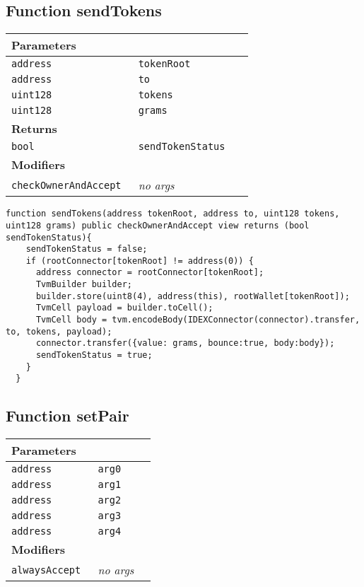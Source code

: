 \subsection{Function sendTokens}


\ifsoltables
\noindent\begin{tabular}{|l|l|p{5cm}|}\hline
\multicolumn{3}{|l|}{\bf Parameters}\\\hline
\tt address & \tt tokenRoot &\\\hline
\tt address & \tt to &\\\hline
\tt uint128 & \tt tokens &\\\hline
\tt uint128 & \tt grams &\\\hline
\multicolumn{3}{|l|}{\bf Returns}\\\hline
\tt bool & \tt sendTokenStatus &\\\hline
\multicolumn{3}{|l|}{\bf Modifiers}\\\hline
\tt checkOwnerAndAccept & {\em no args} &\\\hline
\end{tabular}
\fi

\vspace{2cm}

\begin{lstlisting}[firstnumber=399]
  function sendTokens(address tokenRoot, address to, uint128 tokens, uint128 grams) public checkOwnerAndAccept view returns (bool sendTokenStatus){
    sendTokenStatus = false;
    if (rootConnector[tokenRoot] != address(0)) {
      address connector = rootConnector[tokenRoot];
      TvmBuilder builder;
      builder.store(uint8(4), address(this), rootWallet[tokenRoot]);
      TvmCell payload = builder.toCell();
      TvmCell body = tvm.encodeBody(IDEXConnector(connector).transfer, to, tokens, payload);
      connector.transfer({value: grams, bounce:true, body:body});
      sendTokenStatus = true;
    }
  }
\end{lstlisting}

\subsection{Function setPair}


\ifsoltables
\noindent\begin{tabular}{|l|l|p{5cm}|}\hline
\multicolumn{3}{|l|}{\bf Parameters}\\\hline
\tt address & \tt arg0 &\\\hline
\tt address & \tt arg1 &\\\hline
\tt address & \tt arg2 &\\\hline
\tt address & \tt arg3 &\\\hline
\tt address & \tt arg4 &\\\hline
\multicolumn{3}{|l|}{\bf Modifiers}\\\hline
\tt alwaysAccept & {\em no args} &\\\hline
\end{tabular}
\fi

